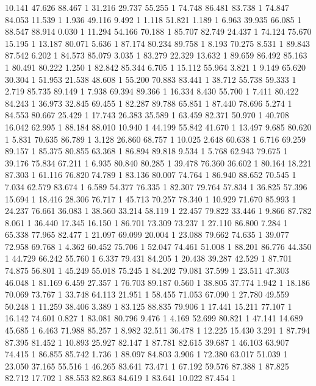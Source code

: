	10.141	47.626	88.467	1
	31.216	29.737	55.255	1
	74.748	86.481	83.738	1
	74.847	84.053	11.539	1
	1.936	49.116	9.492	1
	1.118	51.821	1.189	1
	6.963	39.935	66.085	1
	88.547	88.914	0.030	1
	11.294	54.166	70.188	1
	85.707	82.749	24.437	1
	74.124	75.670	15.195	1
	13.187	80.071	5.636	1
	87.174	80.234	89.758	1
	8.193	70.275	8.531	1
	89.843	87.542	6.202	1
	84.573	85.079	3.035	1
	83.279	22.329	13.632	1
	89.659	86.492	85.163	1
	80.491	80.222	1.250	1
	82.842	85.344	6.705	1
	15.112	55.964	3.821	1
	9.149	65.620	30.304	1
	51.953	21.538	48.608	1
	55.200	70.883	83.441	1
	38.712	55.738	59.333	1
	2.719	85.735	89.149	1
	7.938	69.394	89.366	1
	16.334	8.430	55.700	1
	7.411	80.422	84.243	1
	36.973	32.845	69.455	1
	82.287	89.788	65.851	1
	87.440	78.696	5.274	1
	84.553	80.667	25.429	1
	17.743	26.383	35.589	1
	63.459	82.371	50.970	1
	40.708	16.042	62.995	1
	88.184	88.010	10.940	1
	44.199	55.842	41.670	1
	13.497	9.685	80.620	1
	5.831	70.635	86.789	1
	3.128	26.860	68.757	1
	10.025	2.648	60.638	1
	6.716	69.259	89.157	1
	85.375	80.855	63.368	1
	86.894	89.818	9.534	1
	5.768	62.943	79.675	1
	39.176	75.834	67.211	1
	6.935	80.840	80.285	1
	39.478	76.360	36.602	1
	80.164	18.221	87.303	1
	61.116	76.820	74.789	1
	83.136	80.007	74.764	1
	86.940	88.652	70.545	1
	7.034	62.579	83.674	1
	6.589	54.377	76.335	1
	82.307	79.764	57.834	1
	36.825	57.396	15.694	1
	18.416	28.306	76.717	1
	45.713	70.257	78.340	1
	10.929	71.670	85.993	1
	24.237	76.661	36.083	1
	38.560	33.214	58.119	1
	22.457	79.822	33.446	1
	9.866	87.782	8.061	1
	36.440	17.345	16.150	1
	86.701	73.309	73.237	1
	27.110	86.800	7.284	1
	65.338	77.965	82.477	1
	21.097	69.099	20.004	1
	23.088	79.662	74.635	1
	39.077	72.958	69.768	1
	4.362	60.452	75.706	1
	52.047	74.461	51.008	1
	88.201	86.776	44.350	1
	44.729	66.242	55.760	1
	6.337	79.431	84.205	1
	20.438	39.287	42.529	1
	87.701	74.875	56.801	1
	45.249	55.018	75.245	1
	84.202	79.081	37.599	1
	23.511	47.303	46.048	1
	81.169	6.459	27.357	1
	76.703	89.187	0.560	1
	38.805	37.774	1.942	1
	18.186	70.069	73.767	1
	33.748	64.113	21.951	1
	58.455	71.053	67.090	1
	27.780	49.559	50.248	1
	11.259	38.406	3.389	1
	83.125	88.835	79.906	1
	17.441	15.211	77.107	1
	16.142	74.601	0.827	1
	83.081	80.796	9.476	1
	4.169	52.699	80.821	1
	47.141	14.689	45.685	1
	6.463	71.988	85.257	1
	8.982	32.511	36.478	1
	12.225	15.430	3.291	1
	87.794	87.395	81.452	1
	10.893	25.927	82.147	1
	87.781	82.615	39.687	1
	46.103	63.907	74.415	1
	86.855	85.742	1.736	1
	88.097	84.803	3.906	1
	72.380	63.017	51.039	1
	23.050	37.165	55.516	1
	46.265	83.641	73.471	1
	67.192	59.576	87.388	1
	87.825	82.712	17.702	1
	88.553	82.863	84.619	1
	83.641	10.022	87.454	1
